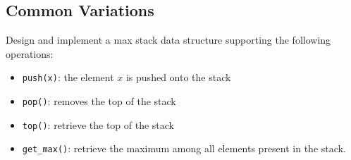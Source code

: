  

\subsection{Common Variations}
\begin{exercise}
	 Design and implement a max stack data structure supporting the following operations:
	\begin{itemize}
		\item \lstinline[columns=fixed]{push(x)}: the element $x$ is pushed onto the stack
		\item \lstinline[columns=fixed]{pop()}: removes the top of the stack
		\item \lstinline[columns=fixed]{top()}: retrieve the top of the stack
		\item \lstinline[columns=fixed]{get_max()}: retrieve the maximum among all elements present in the stack.
	\end{itemize}

\end{exercise}